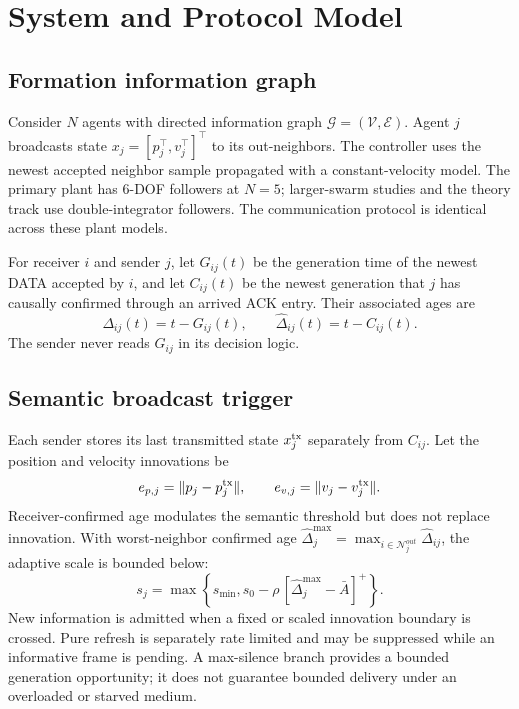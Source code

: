 \section{System and Protocol Model}
\label{sec:s2-system}

\subsection{Formation information graph}

Consider $N$ agents with directed information graph
$\mathcal G=(\mathcal V,\mathcal E)$. Agent $j$ broadcasts state
$x_j=[p_j^\top,v_j^\top]^\top$ to its out-neighbors. The controller uses the
newest accepted neighbor sample propagated with a constant-velocity model.
The primary plant has 6-DOF followers at $N=5$; larger-swarm studies and the
theory track use double-integrator followers. The communication protocol is
identical across these plant models.

For receiver $i$ and sender $j$, let $G_{ij}(t)$ be the generation time of the
newest DATA accepted by $i$, and let $C_{ij}(t)$ be the newest generation that
$j$ has causally confirmed through an arrived ACK entry. Their associated
ages are
\begin{equation}
\Delta_{ij}(t)=t-G_{ij}(t),\qquad
\widehat\Delta_{ij}(t)=t-C_{ij}(t).
\end{equation}
The sender never reads $G_{ij}$ in its decision logic.

\subsection{Semantic broadcast trigger}

Each sender stores its last transmitted state $x_j^{\rm tx}$ separately from
$C_{ij}$. Let the position and velocity innovations be
\begin{equation}
e_{p,j}=\|p_j-p_j^{\rm tx}\|,\qquad
e_{v,j}=\|v_j-v_j^{\rm tx}\|.
\end{equation}
Receiver-confirmed age modulates the semantic threshold but does not replace
innovation. With worst-neighbor confirmed age
$\widehat\Delta_j^{\max}=\max_{i\in\mathcal N_j^{out}}
\widehat\Delta_{ij}$, the adaptive scale is bounded below:
\begin{equation}
s_j=\max\!\left\{s_{\min},
s_0-\rho\,[\widehat\Delta_j^{\max}-\bar A]^+\right\}.
\end{equation}
New information is admitted when a fixed or scaled innovation boundary is
crossed. Pure refresh is separately rate limited and may be suppressed while
an informative frame is pending. A max-silence branch provides a bounded
generation opportunity; it does not guarantee bounded delivery under an
overloaded or starved medium.


